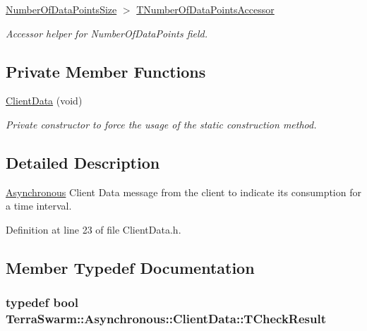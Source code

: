 \begin{DoxyCompactItemize}
\hyperlink{class_terra_swarm_1_1_asynchronous_1_1_client_data_ac66a46fcb609d1205cef15f85cd551b0a5042b9a88db56411ee2879d930f5defb}{Number\-Of\-Data\-Points\-Size} $>$ \hyperlink{class_terra_swarm_1_1_asynchronous_1_1_client_data_a5a4bdd7c49a72f585ba8c0216a241bb8}{T\-Number\-Of\-Data\-Points\-Accessor}
\begin{DoxyCompactList}\small\item\em Accessor helper for Number\-Of\-Data\-Points field. \end{DoxyCompactList}\end{DoxyCompactItemize}
\subsection*{Private Member Functions}
\begin{DoxyCompactItemize}
\item 
\hyperlink{class_terra_swarm_1_1_asynchronous_1_1_client_data_ad17e5aeaa79fe4815bfe6187b32632f4}{Client\-Data} (void)
\begin{DoxyCompactList}\small\item\em Private constructor to force the usage of the static construction method. \end{DoxyCompactList}\end{DoxyCompactItemize}


\subsection{Detailed Description}
\hyperlink{namespace_terra_swarm_1_1_asynchronous}{Asynchronous} Client Data message from the client to indicate its consumption for a time interval. 

Definition at line 23 of file Client\-Data.\-h.



\subsection{Member Typedef Documentation}
\hypertarget{class_terra_swarm_1_1_asynchronous_1_1_client_data_a91575e9105c574792d5216d40f1c89de}{
\subsubsection[{T\-Check\-Result}]{\setlength{\rightskip}{0pt plus 5cm}typedef bool {\bf Terra\-Swarm\-::\-Asynchronous\-::\-Client\-Data\-::\-T\-Check\-Result}}}\label{class_terra_swarm_1_1_asynchronous_1_1_client_data_a91575e9105c574792d5216d40f1c89de}


